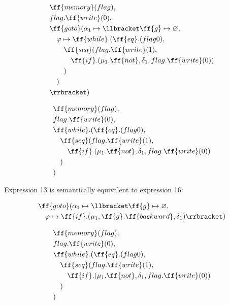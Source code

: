 \documentclass[sigplan,review,11pt,nonacm,natbib=false]{acmart}
\begin{document}
\begin{equation}
\begin{split}
& \ff{memory}(flag), \\
& flag.\ff{write}(0), \\
& \ff{goto}(\alpha_1 \mapsto \llbracket \ff{g} \mapsto \varnothing, \\
& \quad \varphi \mapsto \ff{while}.(\ff{eq}.(flag 0), \\
& \quad \quad \ff{seq}(flag.\ff{write}(1), \\
& \quad \quad  \quad \ff{if}.( \mu_1.\ff{not}, \delta_1, flag.\ff{write}(0) ) \\
& \quad \quad ) \\
& \quad ) \\
& \rrbracket) \\
\end{split}
\end{equation}

\begin{equation}
\begin{split}
& \ff{memory}(flag), \\
& flag.\ff{write}(0), \\
& \ff{while}.(\ff{eq}.(flag 0), \\
& \quad \ff{seq}(flag.\ff{write}(1), \\
& \quad \quad \ff{if}.( \mu_1.\ff{not}, \delta_1, flag.\ff{write}(0) ) \\
& \quad ) \\
& ) \\
\end{split}
\end{equation}

\begin{theorem}
Expression 13 is semantically equivalent to expression 16:
\end{theorem}

\begin{equation} \nonumber
\begin{split}
& \ff{goto}(\alpha_1 \mapsto \llbracket \ff{g} \mapsto \varnothing, \\
& \quad \varphi \mapsto \ff{if}.( \mu_1, \ff{g}.\ff{backward}, \delta_1 ) \rrbracket) \\
\end{split}
\end{equation}

\hline

\begin{equation} \nonumber
\begin{split}
& \ff{memory}(flag), \\
& flag.\ff{write}(0), \\
& \ff{while}.(\ff{eq}.(flag 0), \\
& \quad \ff{seq}(flag.\ff{write}(1), \\
& \quad \quad \ff{if}.( \mu_1.\ff{not}, \delta_1, flag.\ff{write}(0) ) \\
& \quad ) \\
& ) \\
\end{split}
\end{equation}
\end{document}
